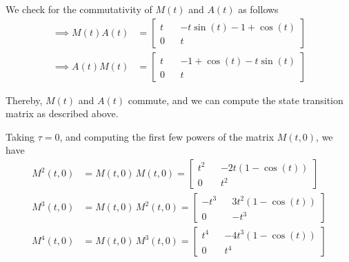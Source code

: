 We check for the commutativity of \( M(t) \) and \( A(t) \) as follows
\begin{align*}
    \implies
    M(t) A(t)
     & =
    \begin{bmatrix}
        t
         &  &
        - t \sin(t) -1 + \cos(t)
        \\
        0
         &  &
        t
    \end{bmatrix}
    \\
    \implies
    A(t) M(t)
     & =
    \begin{bmatrix}
        t
         &  &
        -1 + \cos(t) - t \sin(t)
        \\
        0
         &  &
        t
    \end{bmatrix}
\end{align*}

Thereby, \( M(t) \) and \( A(t) \) commute, and we can compute the state transition matrix as described above.

Taking \( \tau = 0 \), and computing the first few powers of the matrix \( M(t, 0) \), we have
\begin{align*}
    M^2(t, 0)
     & =
    M(t, 0) \,
    M(t, 0)
    =
    \begin{bmatrix}
        t^2 &  & -2t(1 - \cos(t)) \\
        0   &  & t^2
    \end{bmatrix}
    \\
    M^3(t, 0)
     & =
    M(t, 0) \,
    M^2(t, 0)
    =
    \begin{bmatrix}
        -t^3 &  & 3t^2(1 - \cos(t)) \\
        0    &  & -t^3
    \end{bmatrix}
    \\
    M^4(t, 0)
     & =
    M(t, 0) \,
    M^3(t, 0)
    =
    \begin{bmatrix}
        t^4 &  & -4t^3(1 - \cos(t)) \\
        0   &  & t^4
    \end{bmatrix}
\end{align*}


